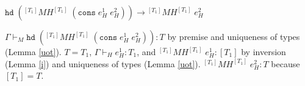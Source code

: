 \begin{case}
$\mathtt{hd}\;(^{[T_{1}]}MH^{[T_{1}]}\;(\mathtt{cons}\;e_{H}^{1}\;e_{H}^{2}))\rightarrow{^{[T_{1}]}M}H^{[T_{1}]}\;e_{H}^{2}$

$\Gamma\vdash_{M}\mathtt{hd}\;(^{[T_{1}]}MH^{[T_{1}]}\;(\mathtt{cons}\;e_{H}^{1}\;e_{H}^{2})):T$ by premise and uniqueness of types (Lemma \ref{uot}).  $T=T_{1}$, $\Gamma\vdash_{H}e_{H}^{1}:T_{1}$, and $^{[T_{1}]}MH^{[T_{1}]}\;e_{H}^{1}:[T_{1}]$ by inversion (Lemma \ref{i}) and uniqueness of types (Lemma \ref{uot}).  $^{[T_{1}]}MH^{[T_{1}]}\;e_{H}^{2}:T$ because $[T_{1}]=T$.
\end{case}